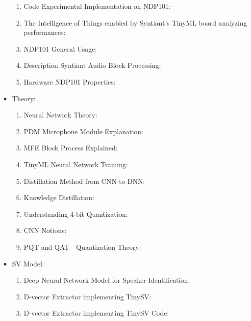 \begin{itemize}
\begin{enumerate}
    \item Code Experimental Implementation on NDP101: \cite{origin_code_1}
    \item The Intelligence of Things enabled by Syntiant's TinyML board analyzing performances: \cite{analysis_syntiant_performances}
    \item NDP101 General Usage: \cite{description_ndp101}
    \item Description Syntiant Audio Block Processing: \cite{syntiant_audio_block}
    \item Hardware NDP101 Properties: \cite{hardware_ndp101}
\end{enumerate}
\item Theory:
\begin{enumerate}
    \item Neural Network Theory: \cite{neural_network_theory}
    \item PDM Microphone Module Explanation: \cite{PDM_module}
    \item MFE Block Process Explained: \cite{audio_processing_theory}
    \item TinyML Neural Network Training: \cite{neural_network_training}
    \item Distillation Method from CNN to DNN: \cite{distillation_from_cnn_to_dnn}
    \item Knowledge Distillation: \cite{knowledge_distillation}
    \item Understanding 4-bit Quantization: \cite{wu2023understandingint4quantizationtransformer}
    \item CNN Notions: \cite{introduction_CNN}
    \item PQT and QAT - Quantization Theory: \cite{ptq_and_qat_indepth_quantization}
\end{enumerate}
\item SV Model:
\begin{enumerate}
    \item Deep Neural Network Model for Speaker Identification: \cite{dnn_speaker_verification}
    \item D-vector Extractor implementing TinySV: \cite{dvector_extractor_TinySV}
    \item D-vector Extractor implementing TinySV Code: \cite{dvector_extractor_code}
\end{enumerate}
\end{itemize}
\newpage


